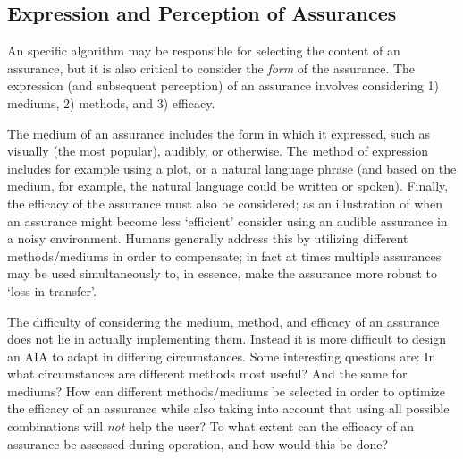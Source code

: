 \subsection{Expression and Perception of Assurances} \label{sec:express_assurances}
An specific algorithm may be responsible for selecting the content of an assurance, but it is also critical to consider the \emph{form} of the assurance. The expression (and subsequent perception) of an assurance involves considering 1) mediums, 2) methods, and 3) efficacy. 

The medium of an assurance includes the form in which it expressed, such as visually (the most popular), audibly, or otherwise. The method of expression includes for example using a plot, or a natural language phrase (and based on the medium, for example, the natural language could be written or spoken). Finally, the efficacy of the assurance must also be considered; as an illustration of when an assurance might become less `efficient' consider using an audible assurance in a noisy environment. Humans generally address this by utilizing different methods/mediums in order to compensate; in fact at times multiple assurances may be used simultaneously to, in essence, make the assurance more robust to `loss in transfer'.

The difficulty of considering the medium, method, and efficacy of an assurance does not lie in actually implementing them. Instead it is more difficult to design an AIA to adapt in differing circumstances. Some interesting questions are: In what circumstances are different methods most useful? And the same for mediums? How can different methods/mediums be selected in order to optimize the efficacy of an assurance while also taking into account that using all possible combinations will \emph{not} help the user? To what extent can the efficacy of an assurance be assessed during operation, and how would this be done?
